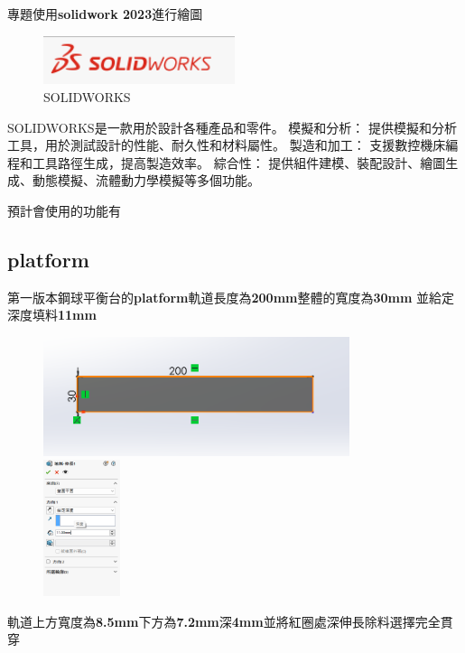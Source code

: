 專題使用\textbf{solidwork 2023}進行繪圖

\begin{figure}[h!]
    \centering
    \includegraphics[width=0.5\textwidth]{./../images/6-1-1.png}
    \caption{SOLIDWORKS}
\end{figure}

\noindent SOLIDWORKS是一款用於設計各種產品和零件。 模擬和分析： 提供模擬和分析工具，用於測試設計的性能、耐久性和材料屬性。 製造和加工： 支援數控機床編程和工具路徑生成，提高製造效率。 綜合性： 提供組件建模、裝配設計、繪圖生成、動態模擬、流體動力學模擬等多個功能。

\noindent 預計會使用的功能有


\subsection{platform}
第一版本鋼球平衡台的\textbf{platform}軌道長度為\textbf{200mm}整體的寬度為\textbf{30mm} 並給定深度填料\textbf{11mm}

\begin{figure}[h!]
    \centering
    \includegraphics[width=0.8\textwidth]{./../images/6-1-11.png}
    \includegraphics[width=0.2\textwidth]{./../images/6-1-12.png}
\end{figure}

\noindent 軌道上方寬度為\textbf{8.5mm}下方為\textbf{7.2mm}深\textbf{4mm}並將紅圈處深伸長除料選擇完全貫穿

